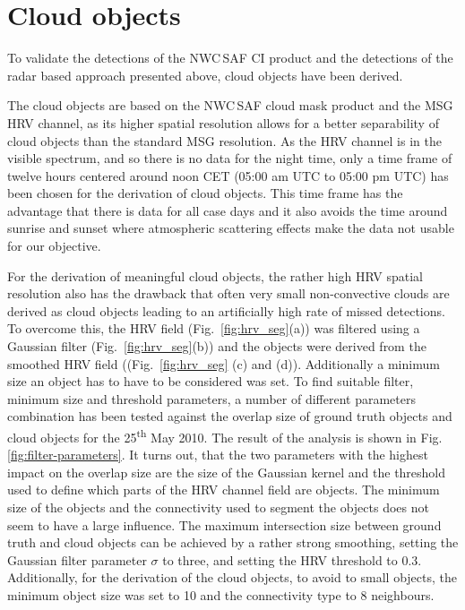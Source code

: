 \section{Cloud objects}
\label{sec:cloud}
To validate the detections of the NWC\,SAF CI product and the detections of the radar based approach presented above, cloud objects have been derived. 

The cloud objects are based on the NWC\,SAF cloud mask product and the MSG HRV channel, as its higher spatial resolution allows for a better separability of cloud objects than the standard MSG resolution. As the HRV channel is in the visible spectrum, and so there is no data for the night time, only a time frame of twelve hours centered around noon CET (05:00 am UTC to 05:00 pm UTC) has been chosen for the derivation of cloud objects. This time frame has the advantage that there is data for all case days and it also avoids the time around sunrise and sunset where atmospheric scattering effects make the data not usable for our objective.

For the derivation of meaningful cloud objects, the rather high HRV spatial resolution also has the drawback that often very small non-convective clouds are derived as cloud objects leading to an artificially high rate of missed detections. To overcome this, the HRV field (Fig.~\ref{fig:hrv_seg}(a)) was filtered using a Gaussian filter (Fig.~\ref{fig:hrv_seg}(b)) and the objects were derived from the smoothed HRV field ((Fig.~\ref{fig:hrv_seg} (c) and (d)). Additionally a minimum size an object has to have to be considered was set. To find suitable filter, minimum size and threshold parameters, a number of different parameters combination has been tested against the overlap size of ground truth objects and cloud objects for the 25\textsuperscript{th} May 2010. The result of the analysis is shown in Fig. \ref{fig:filter-parameters}. It turns out, that the two parameters with the highest impact on the overlap size are the size of the Gaussian kernel and the threshold used to define which parts of the HRV channel field are objects. The minimum size of the objects and the connectivity used to segment the objects does not seem to have a large influence. The maximum intersection size between ground truth and cloud objects can be achieved by a rather strong smoothing, setting the Gaussian filter parameter $\sigma$ to three, and setting the HRV threshold to \num{0.3}. Additionally, for the derivation of the cloud objects, to avoid to small objects, the minimum object size was set to \num{10}  and the connectivity type to \num{8} neighbours. 
 
